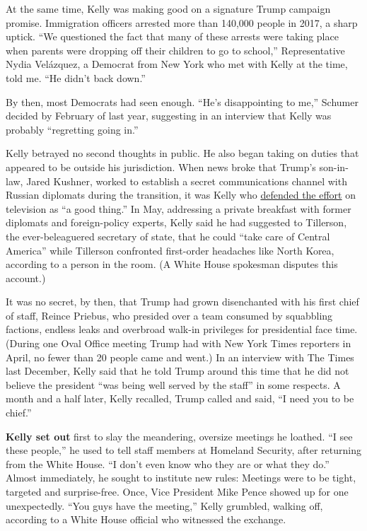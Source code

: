 At the same time, Kelly was making good on a signature Trump campaign
promise. Immigration officers arrested more than 140,000 people in 2017,
a sharp uptick. ``We questioned the fact that many of these arrests were
taking place when parents were dropping off their children to go to
school,'' Representative Nydia Velázquez, a Democrat from New York who
met with Kelly at the time, told me. ``He didn't back down.''

By then, most Democrats had seen enough. ``He's disappointing to me,''
Schumer decided by February of last year, suggesting in an interview
that Kelly was probably ``regretting going in.''

Kelly betrayed no second thoughts in public. He also began taking on
duties that appeared to be outside his jurisdiction. When news broke
that Trump's son-in-law, Jared Kushner, worked to establish a secret
communications channel with Russian diplomats during the transition, it
was Kelly who
\href{https://www.nytimes3xbfgragh.onion/2017/05/28/us/politics/trump-returns-to-us-and-to-berating-newsmedia-on-twitter.html}{defended
the effort} on television as ``a good thing.'' In May, addressing a
private breakfast with former diplomats and foreign-policy experts,
Kelly said he had suggested to Tillerson, the ever-beleaguered secretary
of state, that he could ``take care of Central America'' while Tillerson
confronted first-order headaches like North Korea, according to a person
in the room. (A White House spokesman disputes this account.)

It was no secret, by then, that Trump had grown disenchanted with his
first chief of staff, Reince Priebus, who presided over a team consumed
by squabbling factions, endless leaks and overbroad walk-in privileges
for presidential face time. (During one Oval Office meeting Trump had
with New York Times reporters in April, no fewer than 20 people came and
went.) In an interview with The Times last December, Kelly said that he
told Trump around this time that he did not believe the president ``was
being well served by the staff'' in some respects. A month and a half
later, Kelly recalled, Trump called and said, ``I need you to be
chief.''

\textbf{Kelly set out} first to slay the meandering, oversize meetings
he loathed. ``I see these people,'' he used to tell staff members at
Homeland Security, after returning from the White House. ``I don't even
know who they are or what they do.'' Almost immediately, he sought to
institute new rules: Meetings were to be tight, targeted and
surprise-free. Once, Vice President Mike Pence showed up for one
unexpectedly. ``You guys have the meeting,'' Kelly grumbled, walking
off, according to a White House official who witnessed the exchange.

